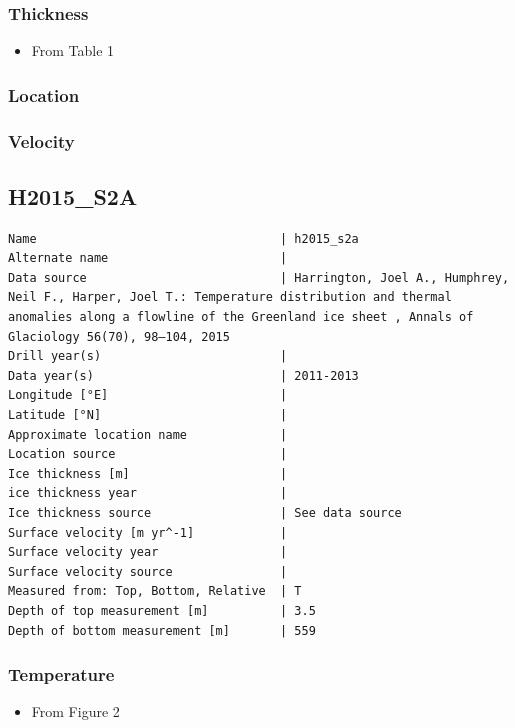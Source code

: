 \documentclass[article,a4paper,times,11pt,twoside]{article}
\begin{document}
\subsubsection{Thickness}
\label{sec:orgf1c5902}

\begin{itemize}
\item From \textcite{harrington_2015} Table 1
\end{itemize}

\subsubsection{Location}
\label{sec:org90f9df6}

\subsubsection{Velocity}
\label{sec:org4aaa6a8}
\clearpage
\subsection{H2015\_S2A}
\label{sec:orgaff62da}
\begin{verbatim}
Name                                  | h2015_s2a
Alternate name                        | 
Data source                           | Harrington, Joel A., Humphrey, Neil F., Harper, Joel T.: Temperature distribution and thermal anomalies along a flowline of the Greenland ice sheet , Annals of Glaciology 56(70), 98–104, 2015 
Drill year(s)                         | 
Data year(s)                          | 2011-2013
Longitude [°E]                        | 
Latitude [°N]                         | 
Approximate location name             | 
Location source                       | 
Ice thickness [m]                     | 
ice thickness year                    | 
Ice thickness source                  | See data source
Surface velocity [m yr^-1]            | 
Surface velocity year                 | 
Surface velocity source               | 
Measured from: Top, Bottom, Relative  | T
Depth of top measurement [m]          | 3.5
Depth of bottom measurement [m]       | 559
\end{verbatim}

\subsubsection{Temperature}
\label{sec:orgd77c5bd}

\begin{itemize}
\item From \textcite{harrington_2015} Figure 2
\end{itemize}
\end{document}
